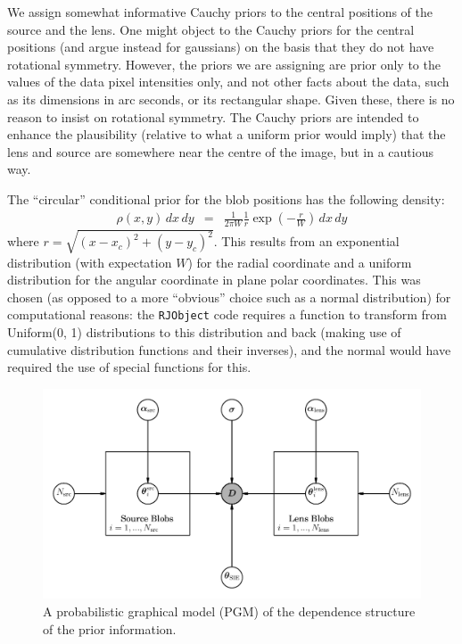 \documentclass[useAMS,usenatbib]{mn2e}
\begin{document}
We assign somewhat informative Cauchy priors to the central positions of the
source and the lens.
One might object to the Cauchy priors
for the central positions (and argue instead for gaussians) on the
basis that they do not have rotational symmetry. However, the priors we
are assigning are prior only to the values of the data pixel intensities only,
and not other facts about the data, such as its dimensions in arc seconds, or its
rectangular shape. Given these, there is no reason to insist on rotational
symmetry. The Cauchy priors are intended to enhance the plausibility
(relative to what a uniform prior would imply) that the
lens and source are somewhere near the centre of the image, but in a cautious
way.

The ``circular'' conditional prior for the blob positions has the following
density:
\begin{eqnarray}
\rho(x, y)\, dx \, dy &=&
\frac{1}{2\pi W} \frac{1}{r}\exp\left(-\frac{r}{W}\right) \, dx \, dy
\end{eqnarray}
where $r = \sqrt{(x-x_c)^2 + (y-y_c)^2}$. This results from an exponential
distribution (with expectation $W$) for the radial coordinate and a uniform distribution for the angular coordinate in plane polar coordinates. This was
chosen (as opposed to a more ``obvious'' choice such as a normal distribution)
for computational reasons: the {\tt RJObject} code requires a function to
transform from Uniform(0, 1) distributions to this distribution and back
(making use of cumulative distribution functions and their inverses), and
the normal would have required the use of special functions for this.

\begin{figure}
\includegraphics{pgm.pdf}
\caption{A probabilistic graphical model (PGM) of the dependence structure
of the prior information.\label{fig:pgm}}
\end{figure}
\end{document}
